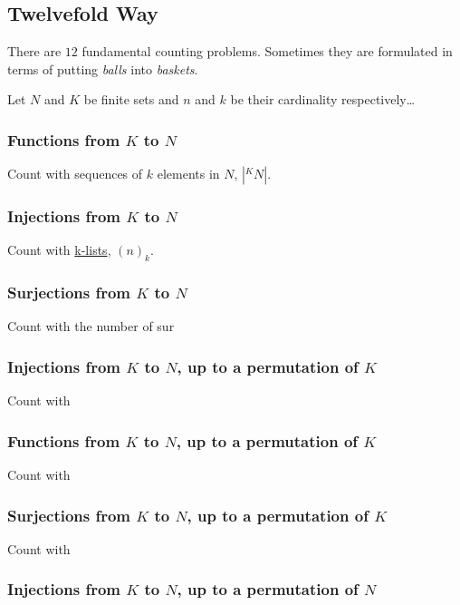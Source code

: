 \subsection{Twelvefold Way}\label{twelvefoldway}

There are $12$ fundamental counting problems. Sometimes they are formulated in terms of putting \emph{balls} into \emph{baskets}.\newline

Let $N$ and $K$ be finite sets and $n$ and $k$ be their cardinality respectively\dots

\subsubsection{Functions from $K$ to $N$}

Count with sequences of $k$ elements in $N$, $|^KN|$.

\subsubsection{Injections from $K$ to $N$}

Count with \hyperref[k-list]{k-lists}, $(n)_k$.

\subsubsection{Surjections from $K$ to $N$}

Count with the number of sur

\subsubsection{Injections from $K$ to $N$, up to a permutation of $K$}

Count with 

\subsubsection{Functions from $K$ to $N$, up to a permutation of $K$}

Count with 

\subsubsection{Surjections from $K$ to $N$, up to a permutation of $K$}

Count with 

\subsubsection{Injections from $K$ to $N$, up to a permutation of $N$}

